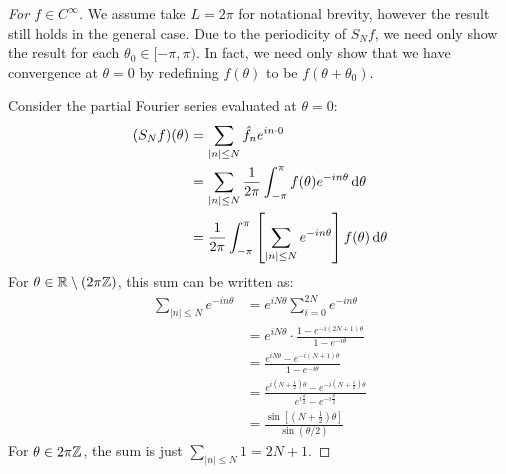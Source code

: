 \documentclass[../main.tex]{subfiles}
\begin{document}
\begin{proof}[For $f \in C^\infty$]
  We assume take $L = 2\pi$ for notational brevity, however the result still holds in the general case.
  Due to the periodicity of $S_N f$, we need only show the result for each $\theta_0 \in [-\pi, \pi)$.
  In fact, we need only show that we have convergence at $\theta = 0$ by redefining $f(\theta)$ to be $f(\theta + \theta_0)$.

  Consider the partial Fourier series evaluated at $\theta = 0$:
  \begin{align*}
    (S_N f)(\theta) &= \sum_{|n| \leq N} \hat{f}_{n} e^{in \cdot 0} \\
                    &= \sum_{|n| \leq N} \frac{1}{2\pi} \int_{-\pi}^{\pi} f(\theta) e^{-i n \theta} \d{\theta} \\
                    &= \frac{1}{2\pi} \int_{-\pi}^{\pi} \left[\sum_{|n| \leq N} e^{-i n \theta} \right] f(\theta) \d{\theta}
  \end{align*}
  For $\theta \in \mathbb{R} \setminus (2 \pi \mathbb{Z})$, this sum can be written as:
  \begin{align*}
    \sum_{|n| \leq N} e^{-i n \theta} &= e^{i N \theta} \sum_{i = 0}^{2N} e^{- i n \theta} \\
                                      &= e^{i N \theta} \cdot \frac{1 - e^{- i (2N + 1) \theta}}{1 - e^{-i \theta}} \\
                                      &= \frac{e^{i N \theta} - e^{- i (N + 1) \theta}}{1 - e^{-i \theta}} \\
                                      &= \frac{e^{i \left(N + \frac{1}{2}\right)\theta} - e^{-i \left(N + \frac{1}{2}\right)\theta}}{e^{i \frac{\theta}{2}} - e^{-i \frac{\theta}{2}}} \\
                                      &= \frac{\sin\left[\left(N + \frac{1}{2}\right)\theta\right]}{\sin(\theta/2)}
  \end{align*}
  For $\theta \in 2 \pi \mathbb{Z}$, the sum is just $\sum_{|n| \leq N} 1 = 2N + 1$.


\end{proof}
\end{document}
